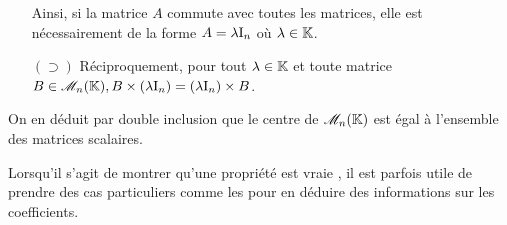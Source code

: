 \begin{demo}
\begin{itemize}
        Ainsi, si la matrice $A$ commute avec toutes les matrices, elle est nécessairement de la forme $A = \lambda \mathrm{I}_n$ où $\lambda \in \mathbb{K}$.
        \item[$(\supset)$] Réciproquement, pour tout $\lambda \in \mathbb{K}$ et toute matrice $B \in \mathscr{M}_n(\mathbb{K}), B \times (\lambda \mathrm{I}_n) = (\lambda \mathrm{I}_n) \times B$. 
    \end{itemize}
    On en déduit par double inclusion que le centre de $\mathscr{M}_n(\mathbb{K})$ est égal à l'ensemble des matrices scalaires. 
\end{demo}

\begin{methode}
    Lorsqu'il s'agit de montrer qu'une propriété est vraie , il est parfois utile de prendre des cas particuliers comme les  pour en déduire des informations sur les coefficients.
\end{methode}
